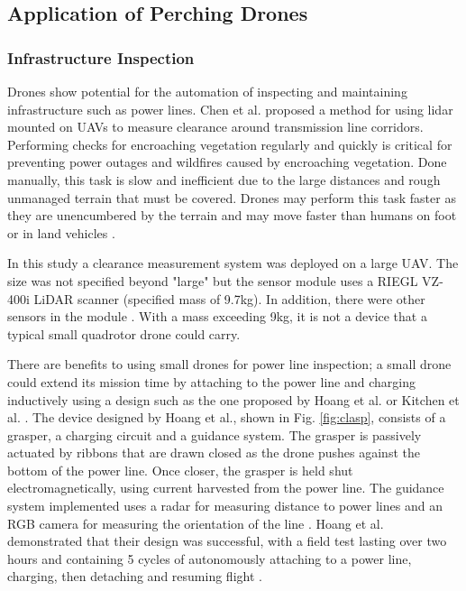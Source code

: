 \subsection{Application of Perching Drones}

\subsubsection{Infrastructure Inspection}

Drones show potential for the automation of inspecting and maintaining infrastructure such as power lines. Chen et al. proposed
a method for using lidar mounted on UAVs to measure clearance around transmission line corridors. Performing
checks for encroaching vegetation regularly and quickly is critical for preventing power outages and wildfires caused by encroaching
vegetation. Done manually, this task is slow and inefficient due to the large distances and rough unmanaged terrain that 
must be covered. Drones may perform this task faster as they are unencumbered by the terrain and may move faster
than humans on foot or in land vehicles \cite{chen_automatic_2018}.

In this study a clearance measurement system was deployed on a large UAV. The size was not specified beyond "large" but the
sensor module uses a RIEGL VZ-400i LiDAR scanner (specified mass of 9.7kg). In addition, there were other sensors in the
module \cite{chen_automatic_2018}. With a mass exceeding 9kg, it is not a device that a typical small quadrotor drone could carry.

There are benefits to using small drones for power line inspection; a small drone could extend its mission time by attaching to the power line
and charging inductively using a design such as the one proposed by Hoang et al. \cite{hoang_autonomous_2024} or Kitchen et al. \cite{kitchen_design_2020}.
The device designed by Hoang et al., shown in Fig. \ref{fig:clasp}, consists of a grasper, a charging circuit and a guidance system. The grasper is passively actuated 
by ribbons that are drawn closed as the drone pushes against the bottom of the power line. Once closer, the grasper is held shut electromagnetically, using
current harvested from the power line. The guidance system implemented uses a radar for measuring distance to power lines and an RGB camera for 
measuring the orientation of the line \cite{hoang_autonomous_2024}.   
Hoang et al. demonstrated that their design was successful, with a field test lasting over two hours and containing 5 cycles of 
autonomously attaching to a power line, charging, then detaching and resuming flight \cite{hoang_autonomous_2024}.

